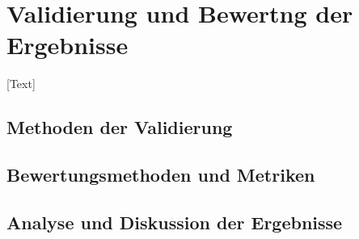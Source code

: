 \chapter{Validierung und Bewertng der Ergebnisse}\label{sec:validierung}
[Text]

\section{Methoden der Validierung}

\section{Bewertungsmethoden und Metriken}

\section{Analyse und Diskussion der Ergebnisse}
